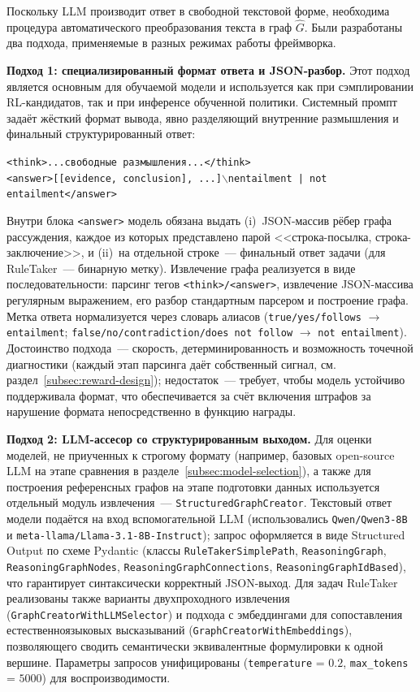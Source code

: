Поскольку LLM производит ответ в свободной текстовой форме, необходима процедура автоматического преобразования текста в граф $\hat{G}$. Были разработаны два подхода, применяемые в разных режимах работы фреймворка.

\textbf{Подход 1: специализированный формат ответа и JSON-разбор.} Этот подход является основным для обучаемой модели и используется как при сэмплировании RL-кандидатов, так и при инференсе обученной политики. Системный промпт задаёт жёсткий формат вывода, явно разделяющий внутренние размышления и финальный структурированный ответ:
\begin{center}
\texttt{<think>...свободные размышления...</think>}\\
\texttt{<answer>[[evidence, conclusion], ...]$\backslash$nentailment | not entailment</answer>}
\end{center}
Внутри блока \texttt{<answer>} модель обязана выдать (i)~JSON-массив рёбер графа рассуждения, каждое из которых представлено парой <<строка-посылка, строка-заключение>>, и (ii)~на отдельной строке~--- финальный ответ задачи (для RuleTaker~--- бинарную метку). Извлечение графа реализуется в виде последовательности: парсинг тегов \texttt{<think>/<answer>}, извлечение JSON-массива регулярным выражением, его разбор стандартным парсером и построение графа. Метка ответа нормализуется через словарь алиасов (\texttt{true/yes/follows} $\to$ \texttt{entailment}; \texttt{false/no/contradiction/does not follow} $\to$ \texttt{not entailment}). Достоинство подхода~--- скорость, детерминированность и возможность точечной диагностики (каждый этап парсинга даёт собственный сигнал, см. раздел~\ref{subsec:reward-design}); недостаток~--- требует, чтобы модель устойчиво поддерживала формат, что обеспечивается за счёт включения штрафов за нарушение формата непосредственно в функцию награды.

\textbf{Подход 2: LLM-ассесор со структурированным выходом.} Для оценки моделей, не приученных к строгому формату (например, базовых open-source LLM на этапе сравнения в разделе~\ref{subsec:model-selection}), а также для построения референсных графов на этапе подготовки данных используется отдельный модуль извлечения~--- \texttt{StructuredGraphCreator}. Текстовый ответ модели подаётся на вход вспомогательной LLM (использовались \texttt{Qwen/\allowbreak Qwen3-8B} и \texttt{meta-llama/\allowbreak Llama-3.1-8B-Instruct}); запрос оформляется в виде Structured Output по схеме Pydantic (классы \texttt{RuleTakerSimplePath}, \texttt{ReasoningGraph}, \texttt{ReasoningGraphNodes}, \texttt{ReasoningGraphConnections}, \texttt{ReasoningGraphIdBased}), что гарантирует синтаксически корректный JSON-выход. Для задач RuleTaker реализованы также варианты двухпроходного извлечения (\texttt{GraphCreatorWithLLMSelector}) и подхода с эмбеддингами для сопоставления естественноязыковых высказываний (\texttt{GraphCreatorWithEmbeddings}), позволяющего сводить семантически эквивалентные формулировки к одной вершине. Параметры запросов унифицированы (\texttt{temperature} = $0{.}2$, \texttt{max\_tokens} = $5000$) для воспроизводимости.

